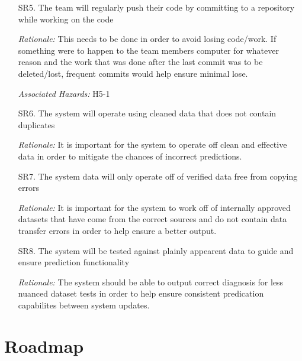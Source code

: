 \documentclass{article}
\begin{document}
\begin{enumerate}
    \item[SR5.] The team will regularly push their code by committing to a repository while working on the code\\
    \item[] \emph{Rationale:} This needs to be done in order to avoid losing code/work. If something were to happen to the team members computer for whatever reason and the work that was done after the last commit was to be deleted/lost, frequent commits would help ensure minimal lose.\\
    \item[] \emph{Associated Hazards:} H5-1 \\
    
    \item[SR6.] The system will operate using cleaned data that does not contain duplicates
	  \item[] \emph{Rationale:} It is important for the system to operate off clean and effective data in order to mitigate the chances of incorrect predictions.
	
	  \item[SR7.] The system data will only operate off of verified data free from copying errors
	  \item[] \emph{Rationale:} It is important for the system to work off of internally approved datasets that have come from the correct sources and do not contain data transfer errors in order to help ensure a better output.

	  \item[SR8.] The system will be tested against plainly appearent data to guide and ensure prediction functionality
	  \item[] \emph{Rationale:} The system should be able to output correct diagnosis for less nuanced dataset tests in order to help ensure consistent predication capabilites between system updates.
    
\end{enumerate}

\section{Roadmap}
\end{document}
